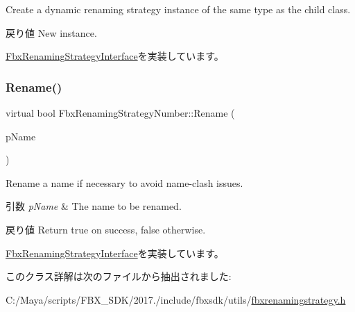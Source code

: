 Create a dynamic renaming strategy instance of the same type as the child class. \begin{DoxyReturn}{戻り値}
New instance. 
\end{DoxyReturn}


\hyperlink{class_fbx_renaming_strategy_interface_ab394ed8a9b5d3ec40334bc933af83907}{Fbx\+Renaming\+Strategy\+Interface}を実装しています。

\mbox{\label{class_fbx_renaming_strategy_number_ae619f9e95e3fcb215a12728dfb739659}} 
\subsubsection{\texorpdfstring{Rename()}{Rename()}}
{\footnotesize\ttfamily virtual bool Fbx\+Renaming\+Strategy\+Number\+::\+Rename (\begin{DoxyParamCaption}\item[{\hyperlink{class_fbx_name_handler}{Fbx\+Name\+Handler} \&}]{p\+Name }\end{DoxyParamCaption})\hspace{0.3cm}{\ttfamily [virtual]}}

Rename a name if necessary to avoid name-\/clash issues. 
\begin{DoxyParams}{引数}
{\em p\+Name} & The name to be renamed. \\
\hline
\end{DoxyParams}
\begin{DoxyReturn}{戻り値}
Return {\ttfamily true} on success, {\ttfamily false} otherwise. 
\end{DoxyReturn}


\hyperlink{class_fbx_renaming_strategy_interface_a1b91016c68dd9c7031624026fd39638a}{Fbx\+Renaming\+Strategy\+Interface}を実装しています。



このクラス詳解は次のファイルから抽出されました\+:\begin{DoxyCompactItemize}
\item 
C\+:/\+Maya/scripts/\+F\+B\+X\+\_\+\+S\+D\+K/2017./include/fbxsdk/utils/\hyperlink{fbxrenamingstrategy_8h}{fbxrenamingstrategy.\+h}\end{DoxyCompactItemize}

